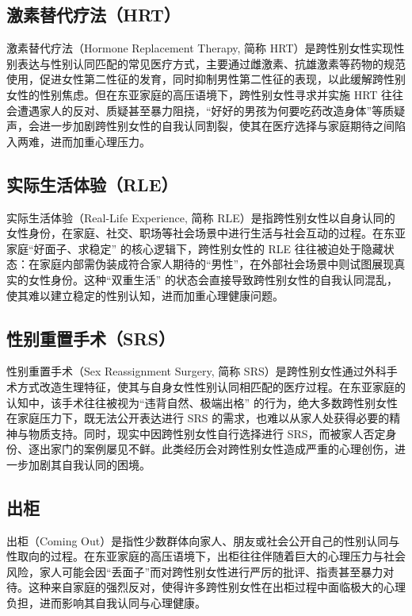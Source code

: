 \documentclass[twocolumn]{ctexart}
\begin{document}
\subsection {激素替代疗法（HRT）}
激素替代疗法（Hormone Replacement Therapy, 简称 HRT）是跨性别女性实现性别表达与性别认同匹配的常见医疗方式，主要通过雌激素、抗雄激素等药物的规范使用，促进女性第二性征的发育，同时抑制男性第二性征的表现，以此缓解跨性别女性的性别焦虑\cite{pan2023gendertrouble, beitongtranscare, Gao2022hormone}。但在东亚家庭的高压语境下，跨性别女性寻求并实施 HRT 往往会遭遇家人的反对、质疑甚至暴力阻挠，“好好的男孩为何要吃药改造身体”等质疑声，会进一步加剧跨性别女性的自我认同割裂，使其在医疗选择与家庭期待之间陷入两难，进而加重心理压力。

\subsection {实际生活体验（RLE）}
实际生活体验（Real-Life Experience, 简称 RLE）是指跨性别女性以自身认同的女性身份，在家庭、社交、职场等社会场景中进行生活与社会互动的过程\cite{pan2023gendertrouble, beitongtranscare}。在东亚家庭“好面子、求稳定” 的核心逻辑下，跨性别女性的 RLE 往往被迫处于隐藏状态：在家庭内部需伪装成符合家人期待的“男性”，在外部社会场景中则试图展现真实的女性身份。这种“双重生活” 的状态会直接导致跨性别女性的自我认同混乱，使其难以建立稳定的性别认知，进而加重心理健康问题。

\subsection {性别重置手术（SRS）}
性别重置手术（Sex Reassignment Surgery, 简称 SRS）是跨性别女性通过外科手术方式改造生理特征，使其与自身女性性别认同相匹配的医疗过程\cite{pan2023gendertrouble, beitongtranscare}。在东亚家庭的认知中，该手术往往被视为“违背自然、极端出格” 的行为，绝大多数跨性别女性在家庭压力下，既无法公开表达进行 SRS 的需求，也难以从家人处获得必要的精神与物质支持。同时，现实中因跨性别女性自行选择进行 SRS，而被家人否定身份、逐出家门的案例屡见不鲜。此类经历会对跨性别女性造成严重的心理创伤，进一步加剧其自我认同的困境。

\subsection {出柜}
出柜（Coming Out）是指性少数群体向家人、朋友或社会公开自己的性别认同与性取向的过程。在东亚家庭的高压语境下，出柜往往伴随着巨大的心理压力与社会风险，家人可能会因“丢面子”而对跨性别女性进行严厉的批评、指责甚至暴力对待。这种来自家庭的强烈反对，使得许多跨性别女性在出柜过程中面临极大的心理负担，进而影响其自我认同与心理健康\cite{comingoutmanual}。
\end{document}
